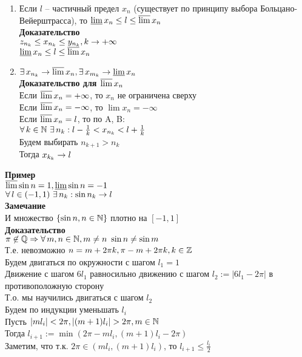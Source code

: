 \documentclass[12pt]{article}
\begin{document}
\begin{enumerate}
    \item Если $l$ -- частичный предел $x_n$ (существует по принципу выбора Больцано-Вейерштрасса), то $\operatorname*{\underline{lim}} x_n \leq l \leq \operatorname*{\overline{lim}} x_n$\\
    \textbf{Доказательство}\\
    $z_{n_k} \leq x_{n_k} \leq y_{n_k}, k \rightarrow +\infty$\\
    $\operatorname*{\underline{lim}} x_n \leq l \leq \operatorname*{\overline{lim}} x_n$
    \item $\exists\, x_{n_k} \rightarrow \operatorname*{\overline{lim}} x_n, \exists\, x_{m_k} \rightarrow \operatorname*{\underline{lim}} x_n$\\
    \textbf{Доказательство для $\operatorname*{\overline{lim}} x_n$}\\
    Если $\operatorname*{\overline{lim}} x_n = +\infty$, то $x_n$ не ограничена сверху\\
    Если $\operatorname*{\overline{lim}} x_n = -\infty$, то $\lim x_n = -\infty$\\
    Если $\operatorname*{\overline{lim}} x_n = l$, то по A, B:\\
    $\forall\, k \in \mathbb{N}\ \exists\, n_k: l-\frac1k < x_{n_k} < l+\frac1k$\\
    Будем выбирать $n_{k+1} > n_k$\\
    Тогда $x_{k_k} \rightarrow l$
\end{enumerate}
\textbf{Пример}\\
$\operatorname*{\overline{lim}} \sin n = 1, \operatorname*{\underline{lim}} \sin n = -1$\\
$\forall\, l \in (-1, 1)\ \exists\, n_k: \sin n_k \rightarrow l$\\
\textbf{Замечание}\\
И множество $\{\sin n, n \in \mathbb{N}\}$ плотно на $[-1, 1]$\\
\textbf{Доказательство}\\
$\pi \not\in \mathbb{Q} \Rightarrow \forall\, m,n \in \mathbb{N}, m\neq n\ \sin n \neq \sin m$\\
Т.е. невозможно $n = m + 2\pi k, \pi - m + 2\pi k, k \in \mathbb{Z}$\\
Будем двигаться по окружности с шагом $l_1 = 1$\\
Движение с шагом $6l_1$ равносильно движению с шагом $l_2 := |6l_1 - 2\pi|$ в противоположную сторону\\
Т.о. мы научились двигаться с шагом $l_2$\\
Будем по индукции уменьшать $l_i$\\
Пусть $|ml_i| < 2\pi, |(m+1)l_i| > 2\pi, m\in \mathbb{N}$\\
Тогда $l_{i+1} := \min (2\pi - ml_i, (m+1)l_i - 2\pi)$\\
Заметим, что т.к. $2\pi \in (ml_i, (m+1)l_i)$, то $l_{i+1} \leq \frac{l_i}2$\\
\end{document}

